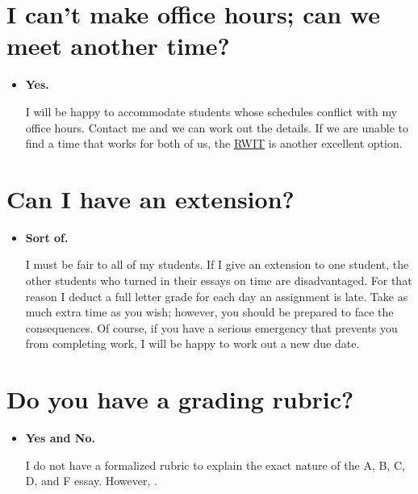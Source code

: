 \section{I can't make office hours; can we meet another time?}
\begin{itemize}
\item {\Large \color{Ahrenge}\textbf{Yes.}} 

I will be happy to accommodate students whose schedules conflict with my office hours. Contact me and we can work out the details. If we are unable to find a time that works for both of us, the \href{https://students.dartmouth.edu/rwit/}{RWIT} is another excellent option.
\end{itemize}

\section{Can I have an extension?}
\begin{itemize}
\item {\Large \color{Ahrenge}\textbf{Sort of.}} 

I must be fair to all of my students. If I give an extension to one student, the other students who turned in their essays on time are disadvantaged. For that reason I deduct a full letter grade for each day an assignment is late. Take as much extra time as you wish; however, you should be prepared to face the consequences. Of course, if you have a serious emergency that prevents you from completing work, I will be happy to work out a new due date.
\end{itemize}

\section{Do you have a grading rubric?}
\begin{itemize}
\item {\Large \color{Ahrenge}\textbf{Yes and No.}} 

I do not have a formalized rubric to explain the exact nature of the A, B, C, D, and F essay. However, \hyperlink{good-writing}{\color{Ahrenge}{here is an explanation of what I value in good academic writing}}. 

\end{itemize}
